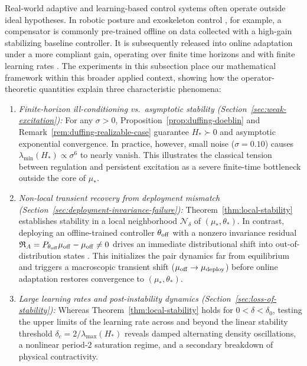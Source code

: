 Real-world adaptive and learning-based control systems often operate outside ideal hypotheses. In robotic posture and exoskeleton control \cite{lippi2018prediction,lippi2021icinco}, for example, a compensator is commonly pre-trained offline on data collected with a high-gain stabilizing baseline controller. It is subsequently released into online adaptation under a more compliant gain, operating over finite time horizons and with finite learning rates \cite{LippiActionError}. The experiments in this subsection place our mathematical framework within this broader applied context, showing how the operator-theoretic quantities explain three characteristic phenomena:
\begin{enumerate}[label=(\roman*)]
    \item \emph{Finite-horizon ill-conditioning vs.\ asymptotic stability (Section~\ref{sec:weak-excitation}):} For any $\sigma>0$, Proposition~\ref{prop:duffing-doeblin} and Remark~\ref{rem:duffing-realizable-case} guarantee $H_*\succ 0$ and asymptotic exponential convergence. In practice, however, small noise ($\sigma=0.10$) causes $\lambda_{\min}(H_*)\propto \sigma^6$ to nearly vanish. This illustrates the classical tension between regulation and persistent excitation \cite{AnnaswamyFradkov2021,Annaswamy2023,LippiActionError} as a severe finite-time bottleneck outside the core of $\mu_*$.
    \item \emph{Non-local transient recovery from deployment mismatch (Section~\ref{sec:deployment-invariance-failure}):} Theorem~\ref{thm:local-stability} establishes stability in a local neighborhood $\mathcal N_\delta$ of $(\mu_*,\theta_*)$. In contrast, deploying an offline-trained controller $\theta_{\rm off}$ with a nonzero invariance residual $\mathfrak R_A = P_{\theta_{\rm off}}\mu_{\rm off}-\mu_{\rm off}\neq 0$ drives an immediate distributional shift into out-of-distribution states \cite{LippiActionError,sinha2023systemlevelviewoutofdistributiondata,kang2022lyapunovdensitymodelsconstraining}. This initializes the pair dynamics far from equilibrium and triggers a macroscopic transient shift ($\mu_{\rm off}\to\mu_{\rm deploy}$) before online adaptation restores convergence to $(\mu_*,\theta_*)$.
    \item \emph{Large learning rates and post-instability dynamics (Section~\ref{sec:loss-of-stability}):} Whereas Theorem~\ref{thm:local-stability} holds for $0<\delta<\delta_0$, testing the upper limits of the learning rate across and beyond the linear stability threshold $\delta_c = 2/\lambda_{\max}(H_*)$ reveals damped alternating density oscillations, a nonlinear period-$2$ saturation regime, and a secondary breakdown of physical contractivity.
\end{enumerate}

